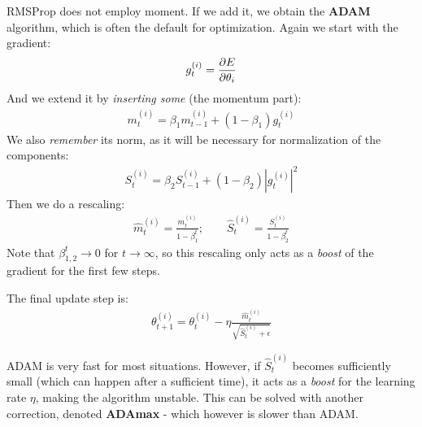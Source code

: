 \documentclass[../template.tex]{subfiles}
\begin{document}
RMSProp does not employ moment. If we add it, we obtain the \textbf{ADAM} algorithm, which is often the default for optimization. Again we start with the gradient:
\begin{align*}
    g_t^{(i)} = \pdv{E}{\theta_i} (\theta_t)
\end{align*} 
And we extend it by \textit{inserting some } (the momentum part): 
\begin{align*}
    m_t^{(i)} = \beta_1 m_{t-1}^{(i)} + (1-\beta_1) g_t^{(i)}
\end{align*}
We also \textit{remember} its norm, as it will be necessary for normalization of the components:
\begin{align*}
    S_t^{(i)} = \beta_2 S_{t-1}^{(i)} + (1-\beta_2)|g_t^{(i)}|^2
\end{align*} 
Then we do a rescaling:
\begin{align*}
    \hat{m}_t^{(i)} = \frac{m_t^{(i)}}{1-\beta_1^t}; \qquad \hat{S}_t^{(i)} = \frac{S_t^{(i)}}{1-\beta_2^t}  
\end{align*}
Note that $\beta_{1,2}^t \to 0$  for $t \to \infty$, so this rescaling only acts as a \textit{boost} of the gradient for the first few steps. 

\medskip
The final update step is:
\begin{align*}
    \theta_{t+1}^{(i)} = \theta_t^{(i)} - \eta \frac{\hat{m}_t^{(i)}}{\sqrt{\hat{S}_t^{(i)}+ \epsilon}} 
\end{align*}

ADAM is very fast for most situations. However, if $\hat{S}_t^{(i)}$ becomes sufficiently small (which can happen after a sufficient time), it acts as a \textit{boost} for the learning rate $\eta$, making the algorithm unstable. This can be solved with another correction, denoted \textbf{ADAmax} - which however is slower than ADAM. 
\end{document}
